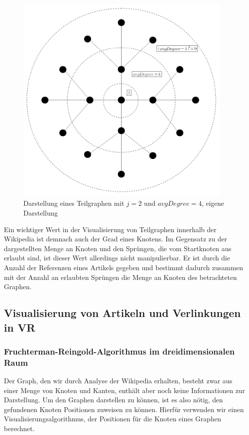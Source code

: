 \documentclass[12pt, a4paper]{article}
\begin{document}
\begin{figure}[h!]
\centering
\includegraphics[width=0.95\textwidth]{graphJumpsFour.png}
\caption[Darstellung eines Teilgraphen mit $j=2$ und $avgDegree=4$]{Darstellung eines Teilgraphen mit $j=2$ und $avgDegree=4$, eigene Darstellung}
\label{graphJumpsFour}
\end{figure}

Ein wichtiger Wert in der Visualisierung von Teilgraphen innerhalb der Wikipedia ist demnach auch der Grad eines Knotens. Im Gegensatz zu der dargestellten Menge an Knoten und den Sprüngen, die vom Startknoten aus erlaubt sind, ist dieser Wert allerdings nicht manipulierbar. Er ist durch die Anzahl der Referenzen eines Artikels gegeben und bestimmt dadurch zusammen mit der Anzahl an erlaubten Sprüngen die Menge an Knoten des betrachteten Graphen.\\

\newpage
\subsection{Visualisierung von Artikeln und Verlinkungen in VR}
\subsubsection{Fruchterman-Reingold-Algorithmus im dreidimensionalen Raum}
Der Graph, den wir durch Analyse der Wikipedia erhalten, besteht zwar aus einer Menge von Knoten und Kanten, enthält aber noch keine Informationen zur Darstellung. Um den Graphen darstellen zu können, ist es also nötig, den gefundenen Knoten Positionen zuweisen zu können. Hierfür verwenden wir einen Visualisierungsalgorithmus, der Positionen für die Knoten eines Graphen berechnet.\\
\end{document}
